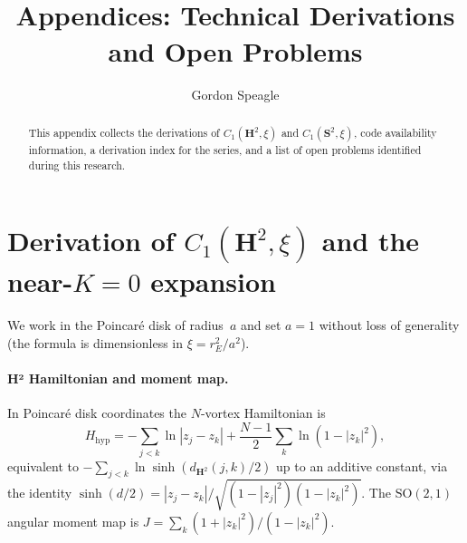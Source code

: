 









\title{\seriestitle\\[6pt]\large Appendices: Technical Derivations and Open Problems}
\author{Gordon Speagle}
\date{}


\maketitle

\begin{abstract}
This appendix collects the derivations of $C_1(\mathbf{H}^2, \xi)$ and $C_1(\mathbf{S}^2, \xi)$, code availability information, a derivation index for the series, and a list of open problems identified during this research.
\end{abstract}


\section{Derivation of $C_1(\mathbf{H}^2,\xi)$ and the near-$K=0$ expansion}
\label{app:c1_h2}

We work in the Poincar\'e disk of radius~$a$ and set $a = 1$ without
loss of generality (the formula is dimensionless in $\xi = r_E^2/a^2$).

\paragraph{H² Hamiltonian and moment map.}
In Poincar\'e disk coordinates the $N$-vortex Hamiltonian is
\citep{Kimura1999}
\begin{equation}\label{eq:H_hyp}
  H_{\mathrm{hyp}} = -\!\sum_{j<k}\ln|z_j - z_k|
    + \frac{N-1}{2}\sum_k \ln(1 - |z_k|^2),
\end{equation}
equivalent to $-\sum_{j<k}\ln\sinh(d_{\mathbf{H}^2}(j,k)/2)$ up to
an additive constant, via the identity
$\sinh(d/2) = |z_j - z_k|/\sqrt{(1-|z_j|^2)(1-|z_k|^2)}$.
The $\mathrm{SO}(2,1)$ angular moment map is
$J = \sum_k(1+|z_k|^2)/(1-|z_k|^2)$.

